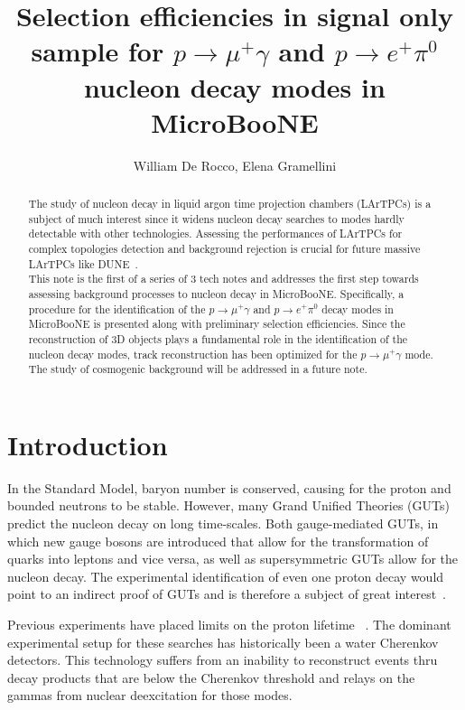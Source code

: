 \documentclass[a4paper, 10pt]{article}
\begin{document}
\title{Selection efficiencies in signal only sample for $p \rightarrow \mu^{+} \gamma$ and $p \rightarrow e^{+} \pi^{0}$ nucleon decay modes in MicroBooNE}
\author{William De Rocco, Elena Gramellini}

\maketitle

\begin{abstract}
The study of nucleon decay in liquid argon time projection chambers (LArTPCs) is a subject of much interest since it widens nucleon decay searches to modes hardly detectable with other technologies. Assessing the performances of LArTPCs  for complex topologies detection and background rejection is crucial for future massive LArTPCs like DUNE~\cite{Adams:2013qkq}.\\
This note is the first of a series of 3 tech notes and addresses the first step towards assessing background processes to nucleon decay in MicroBooNE. Specifically, a procedure for the identification of the $p \rightarrow \mu^{+} \gamma$ and $p \rightarrow e^{+} \pi^{0}$  decay modes in MicroBooNE is presented along with preliminary selection efficiencies. Since the reconstruction of 3D objects plays a fundamental role in the identification of the nucleon decay modes, track reconstruction has been optimized for the $p \rightarrow \mu^{+} \gamma$ mode. The study of cosmogenic background will be addressed in a future note.

\end{abstract}

\tableofcontents
\newpage

\section{Introduction}

In the Standard Model, baryon number is conserved, causing for the proton and bounded neutrons to be stable. However, many Grand Unified Theories (GUTs) predict the nucleon decay on long time-scales. Both gauge-mediated GUTs, in which new gauge bosons are introduced that allow for the transformation of quarks into leptons and vice versa, as well as supersymmetric GUTs allow for the nucleon decay. The experimental identification of even one proton decay would point to an indirect proof of GUTs and is therefore a subject of great interest~\cite{Adams:2013qkq}.

Previous experiments have placed limits on the proton lifetime ~\cite{Akiri:2011dv}. The dominant experimental setup for these searches has historically been a water Cherenkov detectors. This technology suffers from an inability to reconstruct  events  thru decay products that are below the Cherenkov threshold and relays on the gammas from nuclear deexcitation for those modes.
\end{document}
